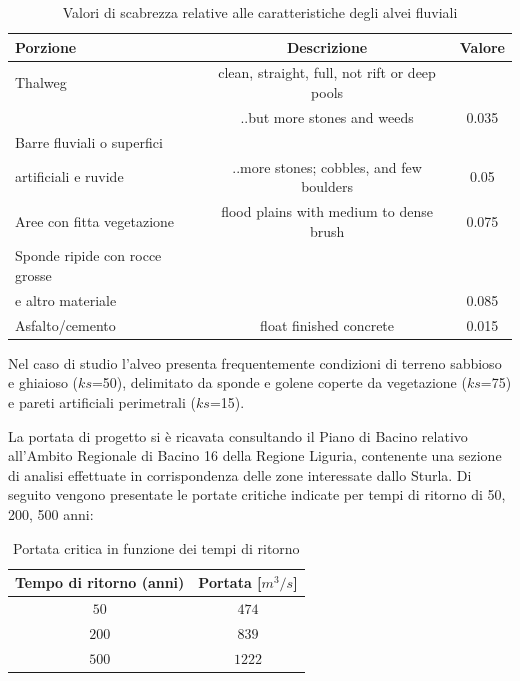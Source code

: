 \documentclass[12pt]{article} %
\begin{document}
\begin{table}[H]
    \centering
    \begin{tabular}{|l|c|c|}
        \hline
        \textbf{Porzione} & \textbf{Descrizione} & \textbf{Valore}  \\
        \hline
        Thalweg & clean, straight, full, not rift or deep pools & \\
        & ..but more stones and weeds &  0.035\\
        Barre fluviali o superfici  & &  \\
        artificiali e ruvide & ..more stones; cobbles, and few boulders & 0.05\\
        Aree con fitta vegetazione & flood plains with medium to dense brush & 0.075\\
        Sponde ripide con rocce grosse & &\\
        e altro materiale & & 0.085\\
        Asfalto/cemento & float finished concrete & 0.015\\
        \hline
    \end{tabular}
    \caption{Valori di scabrezza relative alle caratteristiche degli alvei fluviali}
    \label{tab:Manning_alvei}
\end{table}

\noindent Nel caso di studio l'alveo presenta frequentemente condizioni di terreno sabbioso e ghiaioso ($ks$=50), delimitato da sponde e golene coperte da vegetazione ($ks$=75) e pareti artificiali perimetrali ($ks$=15).

\noindent La portata di progetto si è ricavata consultando il Piano di Bacino relativo all'Ambito Regionale di Bacino 16 della Regione Liguria, contenente una sezione di analisi effettuate in corrispondenza delle zone interessate dallo Sturla. Di seguito vengono presentate le portate critiche indicate per tempi di ritorno di 50, 200, 500 anni:

\begin{table}[H]
    \centering
    \begin{tabular}{|c|c|}
        \hline
        \textbf{Tempo di ritorno (anni)} & \textbf{Portata [$m^3/s$]} \\
        \hline
        $50$ & $474$\\
        $200$ & $839$ \\
        $500$ & $1222$\\
        \hline
    \end{tabular}
    \caption{Portata critica in funzione dei tempi di ritorno}
\end{table}
\end{document}
